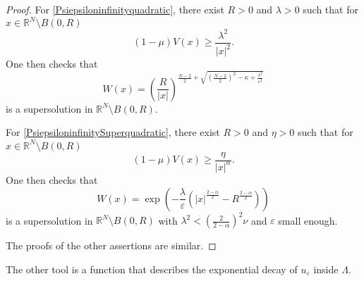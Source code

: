 \documentclass[a4paper]{amsart}
\begin{document}
\begin{proof}
For \eqref{Psiepsiloninfinityquadratic}, there exist $R > 0$ and $\lambda > 0$ such that for 
$x \in {\mathbb{R}}^N\setminus B(0,R)$
\[
 (1-\mu)V(x) \geq \frac{\lambda^2}{{\left| {x} \right|}^2}.
\]
One then checks that
\[
 W(x)=\left(\frac{R}{{\left| {x} \right|}}\right)^{\frac{N-2}{2}+\sqrt{\left(\frac{N-2}{2}\right)^2 - \kappa
+ \frac{\lambda^2}{\varepsilon^2}}}
\]
is a supersolution in ${\mathbb{R}}^N\setminus B(0,R)$.

For \eqref{PsiepsiloninfinitySuperquadratic}, there exist $R > 0$ and $\eta > 0$ such that for 
$x \in {\mathbb{R}}^N\setminus B(0,R)$
\[
 (1-\mu)V(x) \geq \frac{\eta}{{\left| {x} \right|}^\alpha}.
\]
One then checks that 
\[
 W(x)=\exp \left(-\frac{\lambda}{\varepsilon} \left({\left| {x} \right|}^{\frac{2-\alpha}{2}}-R^{\frac{2-\alpha}{2}}\right)\right)
\]
is a supersolution in ${\mathbb{R}}^N\setminus B(0,R)$ with $\lambda^2 < (\frac{2}{2-\alpha})^2 \nu$ and $\varepsilon$ 
small enough.

The proofs of the other assertions are similar.
\end{proof}

The other tool is a function that describes the exponential decay of $u_\varepsilon$ inside $\Lambda$.
\end{document}
